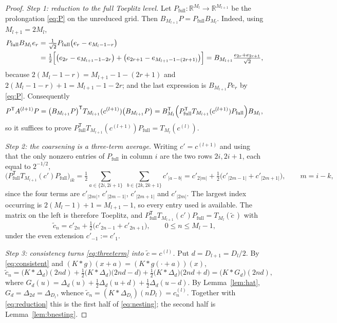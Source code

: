 \documentclass[11pt,a4paper]{article}
\theoremstyle{plain}
\theoremstyle{definition}
\newcommand{\R}{\mathbb{R}}
\newcommand{\T}{\mathsf{T}}
\newcommand{\Tm}[1]{T_{#1}}
\begin{document}
\begin{proof}
\emph{Step 1: reduction to the full Toeplitz level.} Let
$P_{\mathrm{full}}:\R^{M_{l}}\to\R^{M_{l+1}}$ be the prolongation \eqref{eq:P} on the
unreduced grid. Then $B_{M_{l+1}}P=P_{\mathrm{full}}B_{M_{l}}$. Indeed, using
$M_{l+1}=2M_{l}$,
\begin{align*}
  P_{\mathrm{full}}B_{M_{l}}e_{r}
  &=\tfrac{1}{\sqrt2}P_{\mathrm{full}}\bigl(e_{r}-e_{M_{l}-1-r}\bigr)\\
  &=\tfrac12\Bigl[\bigl(e_{2r}-e_{M_{l+1}-1-2r}\bigr)
      +\bigl(e_{2r+1}-e_{M_{l+1}-1-(2r+1)}\bigr)\Bigr]
  =B_{M_{l+1}}\tfrac{e_{2r}+e_{2r+1}}{\sqrt2},
\end{align*}
because $2(M_{l}-1-r)=M_{l+1}-1-(2r+1)$ and $2(M_{l}-1-r)+1=M_{l+1}-1-2r$; and the
last expression is $B_{M_{l+1}}Pe_{r}$ by \eqref{eq:P}. Consequently
\begin{equation}
\label{eq:reduction}
  P^{\T}A^{(l+1)}P
  =\bigl(B_{M_{l+1}}P\bigr)^{\T}\Tm{M_{l+1}}(c^{(l+1)})\bigl(B_{M_{l+1}}P\bigr)
  =B_{M_{l}}^{\T}\Bigl(P_{\mathrm{full}}^{\T}\Tm{M_{l+1}}(c^{(l+1)})
       P_{\mathrm{full}}\Bigr)B_{M_{l}},
\end{equation}
so it suffices to prove
$P_{\mathrm{full}}^{\T}\Tm{M_{l+1}}(c^{(l+1)})P_{\mathrm{full}}=\Tm{M_{l}}(c^{(l)})$.

\emph{Step 2: the coarsening is a three-term average.} Writing $c'=c^{(l+1)}$ and
using that the only nonzero entries of $P_{\mathrm{full}}$ in column $i$ are the two
rows $2i,2i+1$, each equal to $2^{-1/2}$,
\[
  \bigl(P_{\mathrm{full}}^{\T}\Tm{M_{l+1}}(c')P_{\mathrm{full}}\bigr)_{ik}
  =\tfrac12\!\!\sum_{a\in\{2i,2i+1\}}\;\sum_{b\in\{2k,2k+1\}}\!\! c'_{|a-b|}
  =c'_{2|m|}+\tfrac12\bigl(c'_{|2m-1|}+c'_{|2m+1|}\bigr),
  \qquad m=i-k,
\]
since the four terms are $c'_{|2m|}$, $c'_{|2m-1|}$, $c'_{|2m+1|}$ and $c'_{|2m|}$.
The largest index occurring is $2(M_{l}-1)+1=M_{l+1}-1$, so every entry used is
available. The matrix on the left is therefore Toeplitz, and
$P_{\mathrm{full}}^{\T}\Tm{M_{l+1}}(c')P_{\mathrm{full}}=\Tm{M_{l}}(\tilde c\,)$ with
\begin{equation}
\label{eq:threeterm}
  \tilde c_{n}=c'_{2n}+\tfrac12\bigl(c'_{2n-1}+c'_{2n+1}\bigr),
  \qquad 0\le n\le M_{l}-1,
\end{equation}
under the even extension $c'_{-1}:=c'_{1}$.

\emph{Step 3: consistency turns \eqref{eq:threeterm} into $\tilde c=c^{(l)}$.} Put
$d=D_{l+1}=D_{l}/2$. By \eqref{eq:consistent} and $(K*g)(x+a)=(K*g(\cdot+a))(x)$,
\[
  \tilde c_{n}
  =\bigl(K*\Delta_{d}\bigr)(2nd)
   +\tfrac12\bigl(K*\Delta_{d}\bigr)\bigl(2nd-d\bigr)
   +\tfrac12\bigl(K*\Delta_{d}\bigr)\bigl(2nd+d\bigr)
  =\bigl(K*G_{d}\bigr)(2nd),
\]
where $G_{d}(u)=\Delta_{d}(u)+\tfrac12\Delta_{d}(u+d)+\tfrac12\Delta_{d}(u-d)$. By
Lemma~\ref{lem:hat}, $G_{d}=\Delta_{2d}=\Delta_{D_{l}}$, whence
$\tilde c_{n}=(K*\Delta_{D_{l}})(nD_{l})=c^{(l)}_{n}$. Together with
\eqref{eq:reduction} this is the first half of \eqref{eq:nesting}; the second half is
Lemma~\ref{lem:bnesting}.
\end{proof}
\end{document}
